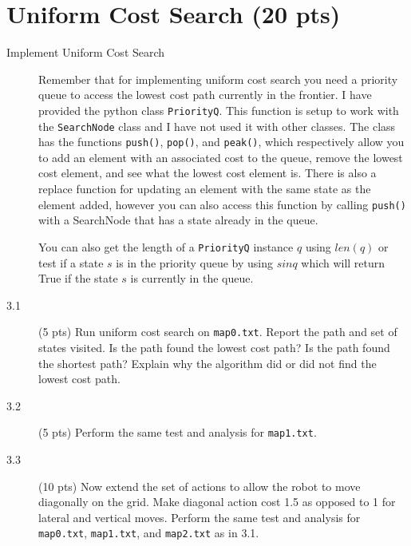 \documentclass[11pt]{hermans-hw}
\begin{document}
\section{Uniform Cost Search (20 pts)}
\begin{description}
\item[Implement Uniform Cost Search] Remember that for implementing uniform cost search you need a priority queue to access the lowest cost path currently in the frontier. I have provided the python class \texttt{PriorityQ}. This function is setup to work with the \texttt{SearchNode} class and I have not used it with other classes. The class has the functions \texttt{push()}, \texttt{pop()}, and \texttt{peak()}, which respectively allow you to add an element with an associated cost to the queue, remove the lowest cost element, and see what the lowest cost element is. There is also a replace function for updating an element with the same state as the element added, however you can also access this function by calling \texttt{push()} with a SearchNode that has a state already in the queue.

You can also get the length of a \texttt{PriorityQ} instance \(q\) using \(len(q)\) or test if a state \(s\) is in the priority queue by using \(s in q\) which will return True if the state \(s\) is currently in the queue.

\item[3.1] (5 pts) Run uniform cost search on \texttt{map0.txt}. Report the path and set of states visited. Is the path found the lowest cost path?
Is the path found the shortest path? Explain why the algorithm did or did not find the lowest cost path.
\item[3.2] (5 pts) Perform the same test and analysis for \texttt{map1.txt}.
\item[3.3] (10 pts) Now extend the set of actions to allow the robot to move diagonally on the grid. Make diagonal action cost 1.5 as opposed to 1 for lateral and vertical moves. Perform the same test and analysis for \texttt{map0.txt}, \texttt{map1.txt}, and \texttt{map2.txt} as in 3.1.

\end{description}
\end{document}
